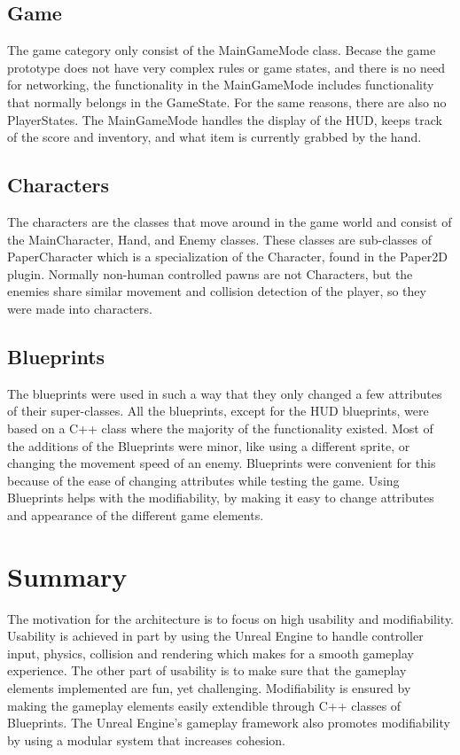 \subsection{Game}
The game category only consist of the MainGameMode class. Becase the game prototype does not have very complex rules or game states, and there is no need for networking, the functionality in the MainGameMode includes functionality that normally belongs in the GameState. For the same reasons, there are also no PlayerStates. The MainGameMode handles the display of the HUD, keeps track of the score and inventory, and what item is currently grabbed by the hand.

\subsection{Characters}
The characters are the classes that move around in the game world and consist of the MainCharacter, Hand, and Enemy classes. These classes are sub-classes of PaperCharacter which is a specialization of the Character, found in the Paper2D plugin. Normally non-human controlled pawns are not Characters, but the enemies share similar movement and collision detection of the player, so they were made into characters.

\subsection{Blueprints}
The blueprints were used in such a way that they only changed a few attributes of their super-classes. All the blueprints, except for the HUD blueprints, were based on a C++ class where the majority of the functionality existed. Most of the additions of the Blueprints were minor, like using a different sprite, or changing the movement speed of an enemy. Blueprints were convenient for this because of the ease of changing attributes while testing the game. Using Blueprints helps with the modifiability, by making it easy to change attributes and appearance of the different game elements.


\section{Summary}
The motivation for the architecture is to focus on high usability and modifiability. Usability is achieved in part by using the Unreal Engine to handle controller input, physics, collision and rendering which makes for a smooth gameplay experience. The other part of usability is to make sure that the gameplay elements implemented are fun, yet challenging. Modifiability is ensured by making the gameplay elements easily extendible through C++ classes of Blueprints. The Unreal Engine's gameplay framework also promotes modifiability by using a modular system that increases cohesion.
